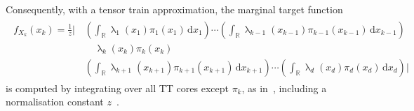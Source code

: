 Consequently, with a tensor train approximation, the marginal target function
\begin{align}
	\begin{split}
		f_{X_k}(x_k) = \frac{1}{z} \Big|\, 
		&\left( \int_{\mathbb{R}} \uplambda_1(x_1) \pi_1(x_1) \, \mathrm{d}x_1 \right) \cdots 
		\left( \int_{\mathbb{R}} \uplambda_{k-1}(x_{k-1}) \pi_{k-1}(x_{k-1}) \, \mathrm{d}x_{k-1} \right) \\
		&\quad \uplambda_k(x_k) \pi_k(x_k) \\
		& \left( \int_{\mathbb{R}} \uplambda_{k+1}(x_{k+1}) \pi_{k+1}(x_{k+1}) \, \mathrm{d}x_{k+1} \right) \cdots 
		\left( \int_{\mathbb{R}} \uplambda_d(x_d) \pi_d(x_d) \, \mathrm{d}x_d \right)
		\Big| 
	\end{split}
\end{align}
is computed by integrating over all TT cores except $\pi_k$, as in~\cite{dolgov2020approximation}, including a normalisation constant $z$~\cite{cui2022deep}.
\\


